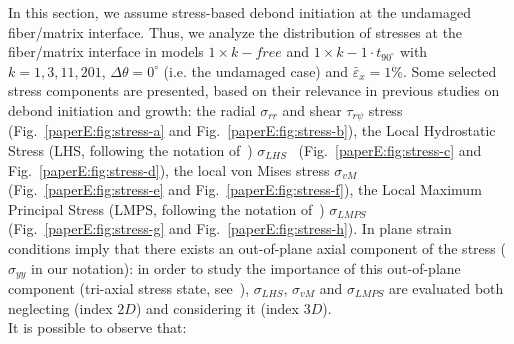 In this section, we assume stress-based debond initiation at the undamaged fiber/matrix interface. Thus, we analyze the distribution of stresses at the fiber/matrix interface in models $1\times k-free$ and $1\times k-1\cdot t_{90^{\circ}}$ with $k=1,3,11,201$, $\Delta\theta=0^{\circ}$ (i.e. the undamaged case) and $\bar{\varepsilon}_{x}=1\%$. Some selected stress components are presented, based on their relevance in previous studies on debond initiation and growth: the radial $\sigma_{rr}$ and shear $\tau_{r\psi}$ stress~\cite{Mantic2009} (Fig.~\ref{paperE:fig:stress-a} and Fig.~\ref{paperE:fig:stress-b}), the Local Hydrostatic Stress (LHS, following the notation of~\cite{Carraro2016}) $\sigma_{LHS}$~\cite{Asp1996a,Asp1996b} (Fig.~\ref{paperE:fig:stress-c} and Fig.~\ref{paperE:fig:stress-d}), the local von Mises stress $\sigma_{vM}$~\cite{Canal2012}  (Fig.~\ref{paperE:fig:stress-e} and Fig.~\ref{paperE:fig:stress-f}), the Local Maximum Principal Stress (LMPS, following the notation of~\cite{Carraro2016}) $\sigma_{LMPS}$~\cite{Carraro2014}  (Fig.~\ref{paperE:fig:stress-g} and Fig.~\ref{paperE:fig:stress-h}). In plane strain conditions imply that there exists an out-of-plane axial component of the stress ($\sigma_{yy}$ in our notation): in order to study the importance of this out-of-plane component (tri-axial stress state, see~\cite{Asp1995}), $\sigma_{LHS}$, $\sigma_{vM}$ and $\sigma_{LMPS}$ are evaluated both neglecting (index $2D$) and considering it (index $3D$).\\
It is possible to observe that:
\vspace{-5pt}
